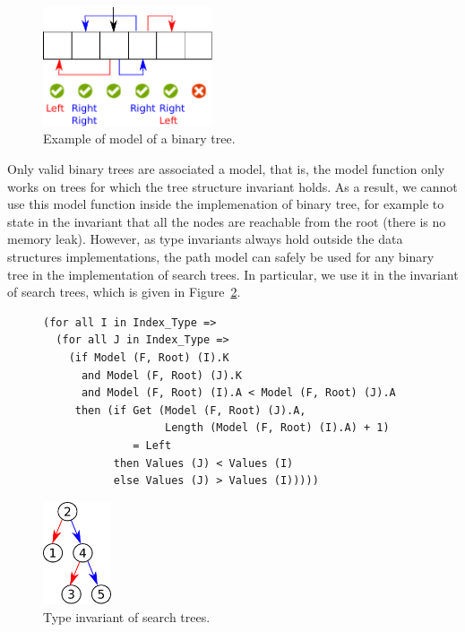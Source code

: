 \documentclass[11pt,a4paper]{article}
\begin{document}
\begin{figure}[ht]
\begin{center}
\includegraphics[width=5cm]{model.pdf}
\caption{\label{fig-binary-mod-ex} Example of model of a binary tree.}
\end{center}
\end{figure}

Only valid binary trees are associated a model, that is, the model function
only works on trees for which the tree structure invariant holds. As a result,
we cannot use this model function inside the implemenation of binary tree,
for example to state in the invariant that all the nodes are reachable from the
root (there is no memory leak). However, as type invariants always hold outside
the data structures implementations, the path model can safely be used for any
binary tree in the implementation of search trees. In particular, we use it
in the invariant of search trees, which is given in Figure~\ref{fig-search}.

\begin{figure}[ht]
\hspace{-2mm}
\begin{minipage}[c]{.78\linewidth}
\begin{small}
\begin{lstlisting}
(for all I in Index_Type =>
  (for all J in Index_Type =>
    (if Model (F, Root) (I).K
      and Model (F, Root) (J).K
      and Model (F, Root) (I).A < Model (F, Root) (J).A
     then (if Get (Model (F, Root) (J).A,
                   Length (Model (F, Root) (I).A) + 1)
              = Left
           then Values (J) < Values (I)
           else Values (J) > Values (I)))))
\end{lstlisting}
\end{small}
\end{minipage}
\begin{minipage}[c]{.22\linewidth}
\begin{center}
\includegraphics[width=2cm]{search.pdf}
\end{center}
\end{minipage}
\caption{\label{fig-search} Type invariant of search trees.}
\end{figure}
\end{document}
